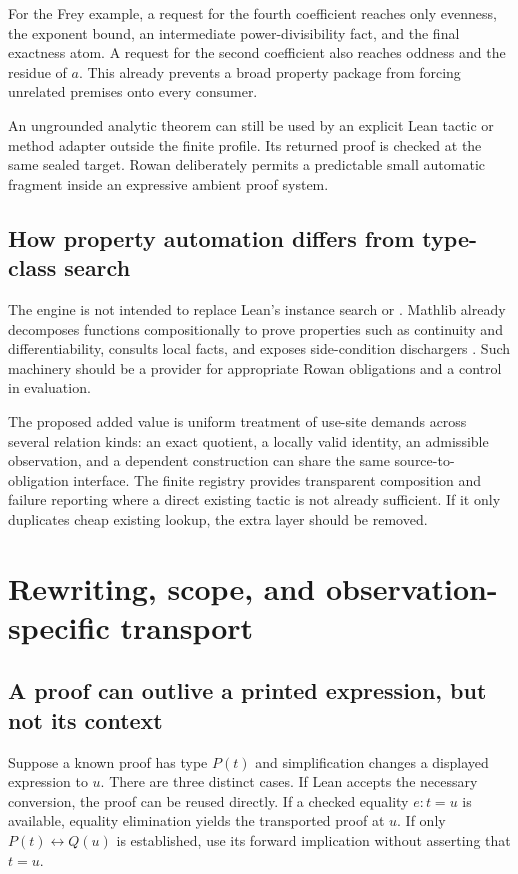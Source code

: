 \documentclass[11pt,letterpaper]{article}
\newcommand{\code}[1]{\texttt{\detokenize{#1}}}
\theoremstyle{definition}\newtheorem{definition}[theorem]{Definition}
\theoremstyle{remark}\newtheorem{remark}[theorem]{Remark}
\begin{document}
For the Frey example, a request for the fourth coefficient reaches only
evenness, the exponent bound, an intermediate power-divisibility fact, and
the final exactness atom. A request for the second coefficient also reaches
oddness and the residue of $a$. This already prevents a broad property package
from forcing unrelated premises onto every consumer.

An ungrounded analytic theorem can still be used by an explicit Lean tactic
or method adapter outside the finite profile. Its returned proof is checked
at the same sealed target. Rowan deliberately permits a predictable small
automatic fragment inside an expressive ambient proof system.

\subsection{How property automation differs from type-class search}
The engine is not intended to replace Lean's instance search or
\code{fun_prop}. Mathlib already decomposes functions compositionally to prove
properties such as continuity and differentiability, consults local facts,
and exposes side-condition dischargers \cite{funprop}. Such machinery should
be a provider for appropriate Rowan obligations and a control in evaluation.

The proposed added value is uniform treatment of use-site demands across
several relation kinds: an exact quotient, a locally valid identity, an
admissible observation, and a dependent construction can share the same
source-to-obligation interface. The finite registry provides transparent
composition and failure reporting where a direct existing tactic is not
already sufficient. If it only duplicates cheap existing lookup, the extra
layer should be removed.

\section{Rewriting, scope, and observation-specific transport}
\label{sec:transport}

\subsection{A proof can outlive a printed expression, but not its context}
Suppose a known proof has type $P(t)$ and simplification changes a displayed
expression to $u$. There are three distinct cases. If Lean accepts the
necessary conversion, the proof can be reused directly. If a checked equality
$e:t=u$ is available, equality elimination yields the transported proof at
$u$. If only $P(t)\leftrightarrow Q(u)$ is established, use its forward
implication without asserting that $t=u$.
\end{document}
